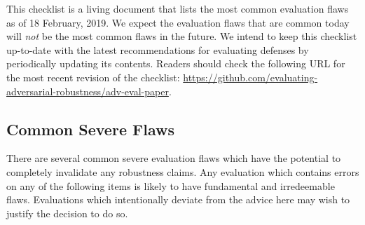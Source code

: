 \documentclass{article} %
\begin{document}
This checklist is a living document that lists the most common evaluation
flaws as of 18 February, 2019. We expect the evaluation flaws that are %
common today will \emph{not} be the most common flaws in the future.
%
We intend to keep this checklist up-to-date with the latest recommendations
for evaluating defenses by periodically updating its contents.
Readers should check the following URL  for the most recent
revision of the checklist:
\url{https://github.com/evaluating-adversarial-robustness/adv-eval-paper}.



\subsection{Common Severe Flaws}
There are several common severe evaluation flaws which have the
potential to completely invalidate any robustness claims.
%
Any evaluation which contains errors on any of the following
items is likely to have fundamental and irredeemable flaws.
%
Evaluations which intentionally deviate from the advice here may wish to
justify the decision to do so.
\end{document}

